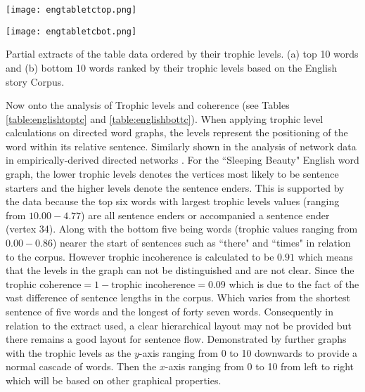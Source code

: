 \begin{table}[!htb]
\centering
\begin{subtable}{.45\textwidth}
	\centering
	\texttt{[image: engtabletctop.png]}
	\caption{}
	\label{table:englishtoptc}
\end{subtable}
\hfill
\begin{subtable}{.45\textwidth}
	\centering
	\texttt{[image: engtabletcbot.png]}
	\caption{}
	\label{table:englishbottc}
\end{subtable}
\caption{Partial extracts of the table data ordered by their trophic levels. (a) top 10 words and (b) bottom 10 words ranked by their trophic levels based on the English story Corpus.}
\end{table}

Now onto the analysis of Trophic levels and coherence (see Tables \ref{table:englishtoptc} and \ref{table:englishbottc}). When applying trophic level calculations on directed word graphs, the levels represent the positioning of the word within its relative sentence. Similarly shown in the analysis of network data in empirically-derived directed networks \cite{johnson2017looplessness}. For the ``Sleeping Beauty" English word graph, the lower trophic levels denotes the vertices most likely to be sentence starters and the higher levels denote the sentence enders. This is supported by the data because the top six words with largest trophic levels values (ranging from $10.00-4.77$) are all sentence enders or accompanied a sentence ender (vertex 34). Along with the bottom five being words (trophic values ranging from $0.00-0.86$) nearer the start of sentences such as ``there" and ``times" in relation to the corpus. However trophic incoherence is calculated to be $0.91$ which means that the levels in the graph can not be distinguished and are not clear. Since the $\text{trophic coherence} = 1 - \text{trophic incoherence} = 0.09$ which is due to the fact of the vast difference of sentence lengths in the corpus. Which varies from the shortest sentence of five words and the longest of forty seven words. Consequently in relation to the extract used, a clear hierarchical layout may not be provided but there remains a good layout for sentence flow. Demonstrated by further graphs with the trophic levels as the $y$-axis ranging from 0 to 10 downwards to provide a normal cascade of words. Then the $x$-axis ranging from 0 to 10 from left to right which will be based on other graphical properties.

